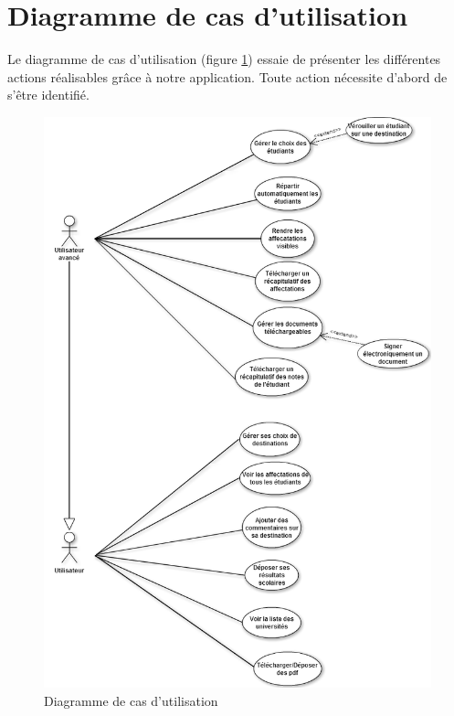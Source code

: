 \newpage
\section{Diagramme de cas d'utilisation}

Le diagramme de cas d'utilisation (figure \ref{useCase}) essaie de présenter les différentes actions réalisables grâce à notre application. Toute action nécessite d'abord de s'être identifié.

\begin{figure}[h!]
  \centering
  \includegraphics[scale=0.4]{Projet/useCaseDiag/useCaseDiagram.png}
  \caption{Diagramme de cas d'utilisation}
  \label{useCase}
\end{figure}

